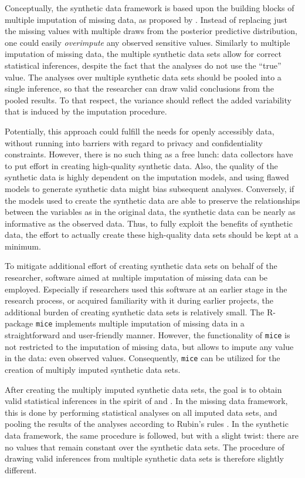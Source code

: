 \documentclass[psych,article,submit,moreauthors,pdftex]{mdpi}
\begin{document}
Conceptually, the synthetic data framework is based upon the building
blocks of multiple imputation of missing data, as proposed by
\citet{rubin_multiple_1987}. Instead of replacing just the missing
values with multiple draws from the posterior predictive distribution,
one could easily \emph{overimpute} any observed sensitive values.
Similarly to multiple imputation of missing data, the multiple synthetic
data sets allow for correct statistical inferences, despite the fact
that the analyses do not use the ``true'' value. The analyses over
multiple synthetic data sets should be pooled into a single inference,
so that the researcher can draw valid conclusions from the pooled
results. To that respect, the variance should reflect the added
variability that is induced by the imputation procedure.

Potentially, this approach could fulfill the needs for openly accessibly
data, without running into barriers with regard to privacy and
confidentiality constraints. However, there is no such thing as a free
lunch: data collectors have to put effort in creating high-quality
synthetic data. Also, the quality of the synthetic data is highly
dependent on the imputation models, and using flawed models to generate
synthetic data might bias subsequent analyses. Conversely, if the models
used to create the synthetic data are able to preserve the relationships
between the variables as in the original data, the synthetic data can be
nearly as informative as the observed data. Thus, to fully exploit the
benefits of synthetic data, the effort to actually create these
high-quality data sets should be kept at a minimum.

To mitigate additional effort of creating synthetic data sets on behalf
of the researcher, software aimed at multiple imputation of missing data
can be employed. Especially if researchers used this software at an
earlier stage in the research process, or acquired familiarity with it
during earlier projects, the additional burden of creating synthetic
data sets is relatively small. The R-package \texttt{mice} \citep{mice}
implements multiple imputation of missing data in a straightforward and
user-friendly manner. However, the functionality of \texttt{mice} is not
restricted to the imputation of missing data, but allows to impute any
value in the data: even observed values. Consequently, \texttt{mice} can
be utilized for the creation of multiply imputed synthetic data sets.

After creating the multiply imputed synthetic data sets, the goal is to
obtain valid statistical inferences in the spirit of
\citet{rubin_multiple_1987} and \citet{neyman1934}. In the missing data
framework, this is done by performing statistical analyses on all
imputed data sets, and pooling the results of the analyses according to
Rubin's rules \citep[pp.76]{rubin_multiple_1987}. In the synthetic data
framework, the same procedure is followed, but with a slight twist:
there are no values that remain constant over the synthetic data sets.
The procedure of drawing valid inferences from multiple synthetic data
sets is therefore slightly different.
\end{document}

